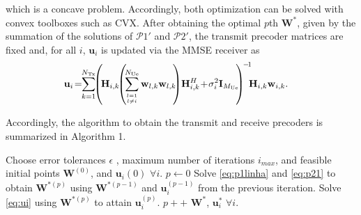 \documentclass[conference,twocolumn,a4paper]{IEEEtran}
\theoremstyle{remark} \newtheorem{remark}{Remark}
\begin{document}
which is a concave problem. Accordingly, both optimization can be solved with convex toolboxes such as CVX. After obtaining the optimal $p$th $\mathbf{W}^*$, given by the summation of the solutions of $\mathcal{P}1'$ and $\mathcal{P}2'$, the transmit precoder matrices are fixed and, for all $i$, $\mathbf{u}_i$ is updated via the MMSE receiver as~\cite{7405344}
\begin{align}
         \mathbf{u}_i\!&=\!\!\sum_{k=1}^{N_{\mathrm{Tx}}}\!\!\left(\!\mathbf{H}_{i,k}\!\!\left(\!\sum_{l=1 \atop l \neq i}^{N_{\mathrm{Ue}}}\mathbf{w}_{l,k}\mathbf{w}_{l,k}\!\!\right)\!\mathbf{H}_{i,k}^H\!+\!\sigma_i^2\mathbf{I}_{M_{\mathrm{Ue}}}\!\!\right)^{\!-\!1}\!\!\!\mathbf{H}_{i,k} \mathbf{w}_{i,k}. \label{eq:ui}
     \end{align}
     
Accordingly, the algorithm to obtain the transmit and receive precoders is summarized in Algorithm 1. 
\begin{algorithm}\label{alg:CCCP}
\caption{Precoders Iterative Algorithm}
\begin{algorithmic}[1]
\footnotesize
       \State Choose error tolerances $\epsilon$ , maximum number of iterations $i_{max}$, and feasible initial points $\mathbf{W}^{(0)}$, and $\mathbf{u}_i(0)$ $\forall i$.
       \State $p \gets 0$
       \Repeat
       \State Solve \eqref{eq:p1linha} and \eqref{eq:p21} to obtain $\mathbf{W}^{*(p)}$ using $\mathbf{W}^{*(p-1)}$ and $\mathbf{u}_{i}^{(p-1)}$ from the previous iteration.
       \State Solve \eqref{eq:ui} using $\mathbf{W}^{*(p)}$ to attain $\mathbf{u}_{i}^{(p)}$.
       \State $p++$
      \State \Return $\mathbf{W}^*$, $\mathbf{u}_i^*$ $\forall i$.  
\end{algorithmic}
\end{algorithm}
\vspace{-0.47cm}
\end{document}
